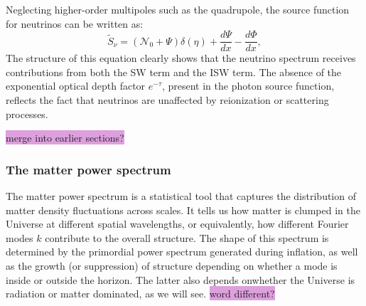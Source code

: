 \documentclass{aa}
\numberwithin{equation}{section}
\numberwithin{table}{section}
\numberwithin{figure}{section}
\begin{document}
Neglecting higher-order multipoles such as the quadrupole, the source function for neutrinos can be written as:
\begin{equation}
\tilde{S}_\nu = (\mathcal{N}_0 + \Psi)\delta(\eta) + \frac{d\Psi}{dx} - \frac{d\Phi}{dx},
\end{equation}
The structure of this equation clearly shows that the neutrino spectrum receives contributions from both the SW term and the ISW term. The absence of the exponential optical depth factor $e^{-\tau}$, present in the photon source function, reflects the fact that neutrinos are unaffected by reionization or scattering processes. 


\colorbox{Plum}{merge into earlier sections?}






\subsubsection{The matter power spectrum}\label{subsubsec: IV theory matter}
The matter power spectrum is a statistical tool that captures the distribution of matter density fluctuations across scales. It tells us how matter is clumped in the Universe at different spatial wavelengths, or equivalently, how different Fourier modes $k$ contribute to the overall structure. The shape of this spectrum is determined by the primordial power spectrum generated during inflation, as well as the growth (or suppression) of structure depending on whether a mode is inside or outside the horizon. The latter also depends onwhether the Universe is radiation or matter dominated, as we will see. \colorbox{Plum}{word different?}
\end{document}
